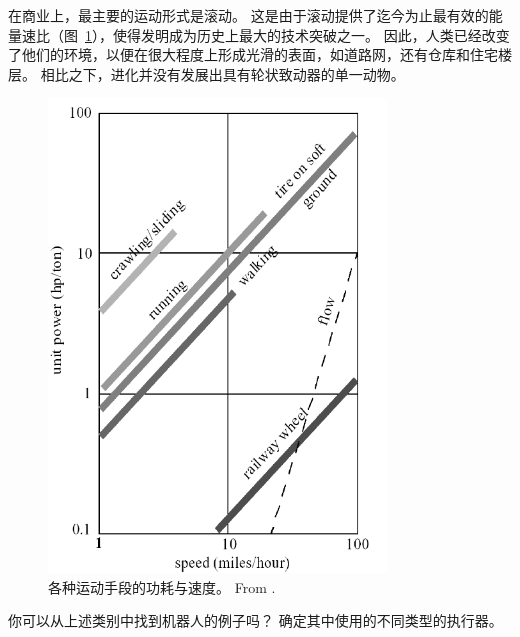 在商业上，最主要的运动形式是滚动。 这是由于滚动提供了迄今为止最有效的能量速比（图~\ref {fig:todd}），使得发明成为历史上最大的技术突破之一。 因此，人类已经改变了他们的环境，以便在很大程度上形成光滑的表面，如道路网，还有仓库和住宅楼层。 相比之下，进化并没有发展出具有轮状致动器的单一动物。

\begin{figure}
	\centering
		\includegraphics[width=0.8\textwidth]{figs/todd85.png}
	\caption{各种运动手段的功耗与速度。 From \protect{}.}
	\label{fig:todd}
\end{figure}


\begin{framed}
你可以从上述类别中找到机器人的例子吗？ 确定其中使用的不同类型的执行器。
\end{framed}

